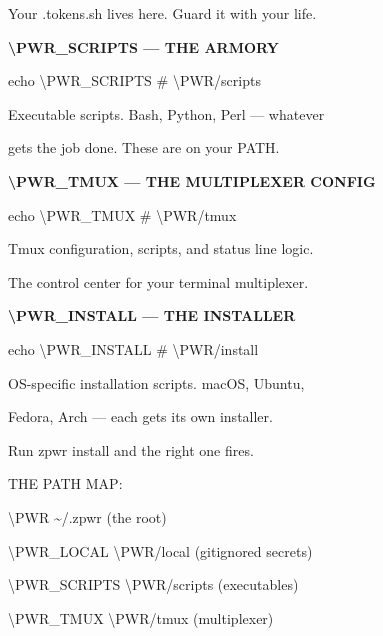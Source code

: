 \documentclass[11pt,a4paper,twoside]{book}
\begin{document}
Your .tokens.sh lives here. Guard it with your life.


\vspace{12pt}
{\bfseries\color{neonyellow} \textbackslash{}PWR\_SCRIPTS — THE ARMORY}\vspace{4pt}

echo \textbackslash{}PWR\_SCRIPTS   \# \textbackslash{}PWR/scripts

Executable scripts. Bash, Python, Perl — whatever

gets the job done. These are on your PATH.


\vspace{12pt}
{\bfseries\color{neonyellow} \textbackslash{}PWR\_TMUX — THE MULTIPLEXER CONFIG}\vspace{4pt}

\begin{codebox}
echo \textbackslash{}PWR\_TMUX   \# \textbackslash{}PWR/tmux\\
\end{codebox}

Tmux configuration, scripts, and status line logic.

The control center for your terminal multiplexer.


\vspace{12pt}
{\bfseries\color{neonyellow} \textbackslash{}PWR\_INSTALL — THE INSTALLER}\vspace{4pt}

echo \textbackslash{}PWR\_INSTALL   \# \textbackslash{}PWR/install

OS-specific installation scripts. macOS, Ubuntu,

Fedora, Arch — each gets its own installer.

\begin{codebox}
Run zpwr install and the right one fires.\\
\end{codebox}

THE PATH MAP:

\begin{codebox}
\textbackslash{}PWR                \textasciitilde{}/.zpwr (the root)\\
\end{codebox}

\textbackslash{}PWR\_LOCAL          \textbackslash{}PWR/local (gitignored secrets)

\textbackslash{}PWR\_SCRIPTS        \textbackslash{}PWR/scripts (executables)

\begin{codebox}
\textbackslash{}PWR\_TMUX           \textbackslash{}PWR/tmux (multiplexer)\\
\end{codebox}
\end{document}
